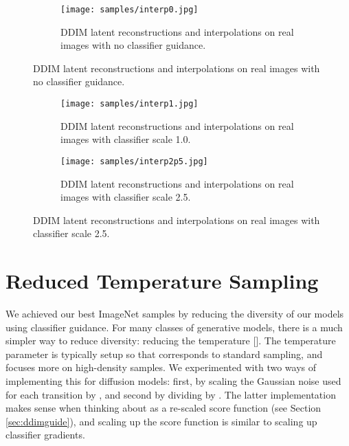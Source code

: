 \documentclass{article}
\newcommand{\shortcite}[1]{[\citenum{#1}]}
\begin{document}
\begin{figure}[h]
    \begin{center}
    \begin{subfigure}{\textwidth}
        \centering
        \texttt{[image: samples/interp0.jpg]}
        \caption{\label{fig:interpfirst} DDIM latent reconstructions and interpolations on real images with no classifier guidance.}
    \end{subfigure}
        \end{center}
\end{figure}
\clearpage   
\begin{figure}[tb]\ContinuedFloat
    \begin{center}
    \begin{subfigure}{\textwidth}
        \centering
        \texttt{[image: samples/interp1.jpg]}
        \caption{DDIM latent reconstructions and interpolations on real images with classifier scale 1.0.}
    \end{subfigure}
    \par\medskip
    \begin{subfigure}{\textwidth}
        \centering
        \texttt{[image: samples/interp2p5.jpg]}
        \caption{\label{fig:interplast} DDIM latent reconstructions and interpolations on real images with classifier scale 2.5.}
    \end{subfigure}
    \end{center}
\end{figure}

\clearpage
\section{Reduced Temperature Sampling}
\label{app:temperature}

We achieved our best ImageNet samples by reducing the diversity of our models using classifier guidance. For many classes of generative models, there is a much simpler way to reduce diversity: reducing the temperature \shortcite{temperature}. The temperature parameter  is typically setup so that  corresponds to standard sampling, and  focuses more on high-density samples. We experimented with two ways of implementing this for diffusion models: first, by scaling the Gaussian noise used for each transition by , and second by dividing  by . The latter implementation makes sense when thinking about  as a re-scaled score function (see Section \ref{sec:ddimguide}), and scaling up the score function is similar to scaling up classifier gradients.
\end{document}
